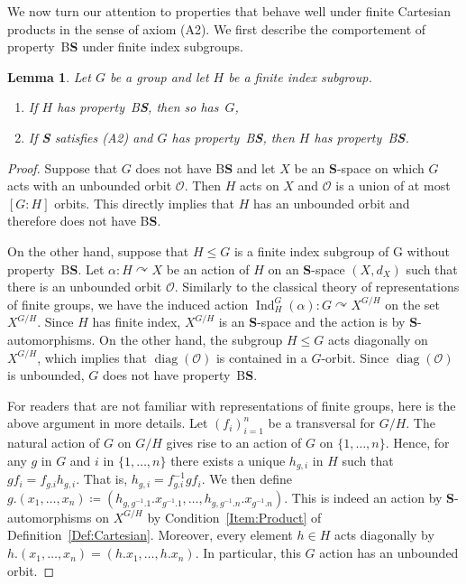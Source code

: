 \documentclass[a4paper]{article}
\newtheorem{lem}{Lemma}[section]
\theoremstyle{definition}
\DeclareMathOperator\Ind{Ind}
\DeclareMathOperator\diag{diag}
\newcommand*{\orbite}{\mathcal O}
\newcommand*{\category}[1]{\textbf{#1}}
\newcommand*{\CatS}{\category{S}}
\newcommand*{\BS}{B\textbf{S}}
\begin{document}
We now turn our attention to properties that behave well under finite Cartesian products in the sense of axiom (A2).
We first describe the comportement of property~\BS{} under finite index subgroups.
%
%
\begin{lem}\label{Lemma:Subgroup}
Let $G$ be a group and let $H$ be a finite index subgroup.
\begin{enumerate}
\item
If $H$ has property~\BS, then so has~$G$,
\item
If \CatS{} satisfies (A2) and $G$ has property~\BS, then $H$ has property~\BS.
\end{enumerate}
\end{lem}
\begin{proof}
Suppose that $G$ does not have \BS{} and let $X$ be an \CatS-space on which $G$ acts with an unbounded orbit $\orbite$.
Then $H$ acts on $X$ and $\orbite$ is a union of at most $[G:H]$ orbits. This directly implies that $H$ has an unbounded orbit and therefore does not have \BS.

On the other hand, suppose that $H\leq G$ is a finite index subgroup of G without property~\BS.
Let $\alpha\colon H\curvearrowright X$ be an action of $H$ on an \CatS-space $(X,d_X)$ such that there is an unbounded orbit $\orbite$.
Similarly to the classical theory of representations of finite groups, we have the induced  action $\Ind_H^G(\alpha)\colon G \curvearrowright X^{G/H}$ on the set $X^{G/H}$. Since $H$ has finite index, $X^{G/H}$ is an \CatS-space and the action is by \CatS-automorphisms. On the other hand, the subgroup $H\leq G$ acts diagonally on $X^{G/H}$, which implies that $\diag(\orbite)$ is contained in a $G$-orbit.
Since $\diag(\orbite)$ is unbounded, $G$ does not have property~\BS.

For readers that are not familiar with representations of finite groups, here is the above argument in more details.
Let $(f_i)_{i=1}^n$ be a transversal for $G/H$.
The natural action of $G$ on $G/H$ gives rise to an action of $G$ on $\{1,\dots,n\}$.
Hence, for any $g$ in $G$ and $i$ in $\{1,\dots,n\}$ there exists a unique $h_{g,i}$ in $H$ such that $gf_i=f_{g.i}h_{g,i}$. That is, $h_{g,i}=f_{g.i}^{-1}gf_i$.
We then define $g.(x_1,\dots,x_n)\coloneqq(h_{g,g^{-1}.1}.x_{g^{-1}.1},\dots,h_{g,g^{-1}.n}.x_{g^{-1}.n})$. This is indeed an action by \CatS-auto\-mor\-phisms on $X^{G/H}$ by Condition~\ref{Item:Product} of Definition~\ref{Def:Cartesian}.
Moreover, every element $h\in H$ acts diagonally by $h.(x_1,\dots,x_n)=(h.x_1,\dots,h.x_n)$.
In particular, this $G$ action has an unbounded orbit.
\end{proof}
\end{document}
